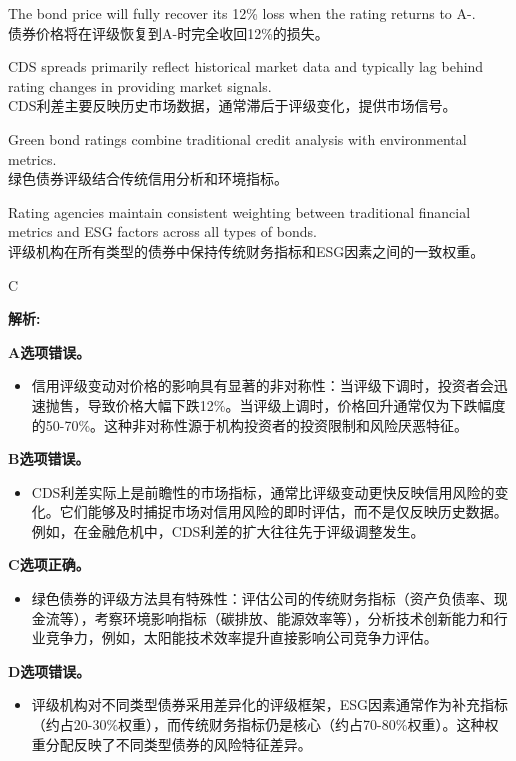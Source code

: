 \documentclass{article}
\newenvironment{explanation}
{\textbf{解析:}\par}
{\par}
\begin{document}
\begin{choices}
    \item The bond price will fully recover its 12\% loss when the rating returns to A-.\\
    债券价格将在评级恢复到A-时完全收回12\%的损失。
    
    \item CDS spreads primarily reflect historical market data and typically lag behind rating changes in providing market signals.\\
    CDS利差主要反映历史市场数据，通常滞后于评级变化，提供市场信号。
    
    \item Green bond ratings combine traditional credit analysis with environmental metrics.\\
    绿色债券评级结合传统信用分析和环境指标。
    
    \item Rating agencies maintain consistent weighting between traditional financial metrics and ESG factors across all types of bonds.\\
    评级机构在所有类型的债券中保持传统财务指标和ESG因素之间的一致权重。
\end{choices}
    
\begin{correctanswer}
    C
\end{correctanswer}
    
\begin{explanation}
    \textbf{A选项错误。}
    \begin{itemize}
        \item 信用评级变动对价格的影响具有显著的非对称性：当评级下调时，投资者会迅速抛售，导致价格大幅下跌12\%。当评级上调时，价格回升通常仅为下跌幅度的50-70\%。这种非对称性源于机构投资者的投资限制和风险厌恶特征。
    \end{itemize}
    
    \textbf{B选项错误。}
    \begin{itemize}
        \item CDS利差实际上是前瞻性的市场指标，通常比评级变动更快反映信用风险的变化。它们能够及时捕捉市场对信用风险的即时评估，而不是仅反映历史数据。例如，在金融危机中，CDS利差的扩大往往先于评级调整发生。
    \end{itemize}
    
    \textbf{C选项正确。}
    \begin{itemize}
        \item 绿色债券的评级方法具有特殊性：评估公司的传统财务指标（资产负债率、现金流等），考察环境影响指标（碳排放、能源效率等），分析技术创新能力和行业竞争力，例如，太阳能技术效率提升直接影响公司竞争力评估。
    \end{itemize}
    
    \textbf{D选项错误。}
    \begin{itemize}
        \item 评级机构对不同类型债券采用差异化的评级框架，ESG因素通常作为补充指标（约占20-30\%权重），而传统财务指标仍是核心（约占70-80\%权重）。这种权重分配反映了不同类型债券的风险特征差异。
    \end{itemize}
\end{explanation}
\end{document}
